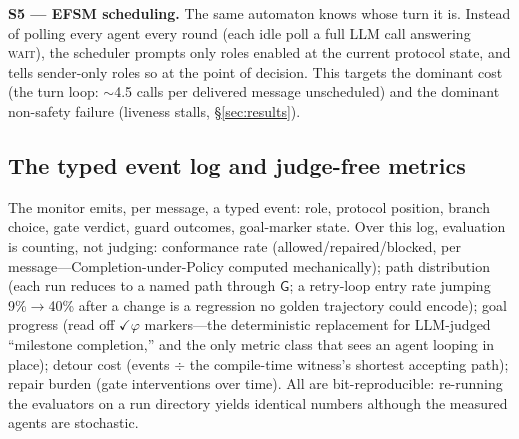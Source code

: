 \documentclass{article}
\newcommand{\gtG}{\mathsf{G}}
\begin{document}
\textbf{S5 --- EFSM scheduling.} The same automaton knows whose turn it is. Instead of polling every agent every round (each idle poll a full LLM call answering \textsc{wait}), the scheduler prompts only roles enabled at the current protocol state, and tells sender-only roles so at the point of decision. This targets the dominant cost (the turn loop: $\sim$4.5 calls per delivered message unscheduled) and the dominant non-safety failure (liveness stalls, \S\ref{sec:results}).

\subsection{The typed event log and judge-free metrics}\label{sec:log}
The monitor emits, per message, a typed event: role, protocol position, branch choice, gate verdict, guard outcomes, goal-marker state. Over this log, evaluation is counting, not judging: conformance rate (allowed/repaired/blocked, per message---Completion-under-Policy computed mechanically); path distribution (each run reduces to a named path through $\gtG$; a retry-loop entry rate jumping 9\%$\to$40\% after a change is a regression no golden trajectory could encode); goal progress (read off $\checkmark\varphi$ markers---the deterministic replacement for LLM-judged ``milestone completion,'' and the only metric class that sees an agent looping in place); detour cost (events $\div$ the compile-time witness's shortest accepting path); repair burden (gate interventions over time). All are bit-reproducible: re-running the evaluators on a run directory yields identical numbers although the measured agents are stochastic.
\end{document}
